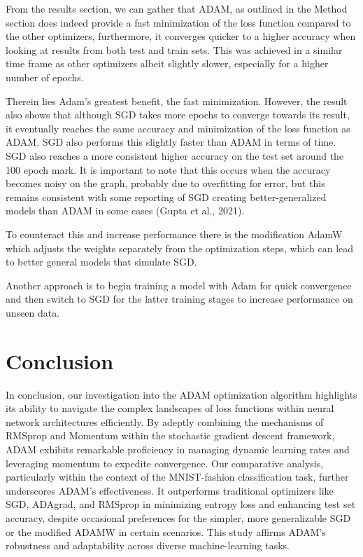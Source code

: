 \documentclass[oneside]{article}
\begin{document}
 From the results section, we can gather that ADAM, as outlined in the Method section does indeed provide a fast minimization of the loss function compared to the other optimizers, furthermore, it converges quicker to a higher accuracy when looking at results from both test and train sets. This was achieved in a similar time frame as other optimizers albeit slightly slower, especially for a higher number of epochs. \par
 Therein lies Adam's greatest benefit, the fast minimization. However, the result also shows that although SGD takes more epochs to converge towards its result, it eventually reaches the same accuracy and minimization of the loss function as ADAM. SGD also performs this slightly faster than ADAM in terms of time. SGD also reaches a more consistent higher accuracy on the test set around the 100 epoch mark. It is important to note that this occurs when the accuracy becomes noisy on the graph, probably due to overfitting for error, but this remains consistent with some reporting of SGD creating better-generalized models than ADAM in some cases (Gupta et al., 2021). \par
 To counteract this and increase performance there is the modification AdamW which adjusts the weights separately from the optimization steps, which can lead to better general models that simulate SGD.\par
 Another approach is to begin training a model with Adam for quick convergence and then switch to SGD for the latter training stages to increase performance on unseen data.

\section{Conclusion}

In conclusion, our investigation into the ADAM optimization algorithm highlights its ability to navigate the complex landscapes of loss functions within neural network architectures efficiently. By adeptly combining the mechanisms of RMSprop and Momentum within the stochastic gradient descent framework, ADAM exhibits remarkable proficiency in managing dynamic learning rates and leveraging momentum to expedite convergence. Our comparative analysis, particularly within the context of the MNIST-fashion classification task, further underscores ADAM's effectiveness. It outperforms traditional optimizers like SGD, ADAgrad, and RMSprop in minimizing entropy loss and enhancing test set accuracy, despite occasional preferences for the simpler, more generalizable SGD or the modified ADAMW in certain scenarios. This study affirms ADAM's robustness and adaptability across diverse machine-learning tasks.
\end{document}

